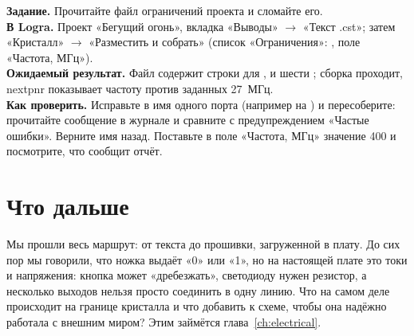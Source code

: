 \begin{diybox}
\textbf{Задание.} Прочитайте файл ограничений проекта и сломайте его.\\
\textbf{В Logra.} Проект «Бегущий огонь», вкладка «Выводы» $\to$ «Текст .cst»; затем «Кристалл» $\to$ «Разместить и собрать» (список «Ограничения»: , поле «Частота, МГц»).\\
\textbf{Ожидаемый результат.} Файл содержит строки  для ,  и шести ; сборка проходит, nextpnr показывает частоту против заданных 27~МГц.\\
\textbf{Как проверить.}  Исправьте в  имя одного порта (например  на ) и пересоберите: прочитайте сообщение в журнале и сравните с предупреждением «Частые ошибки». Верните имя назад.  Поставьте в поле «Частота, МГц» значение 400 и посмотрите, что сообщит отчёт.
\end{diybox}

\section{Что дальше}

Мы прошли весь маршрут: от текста до прошивки, загруженной в плату. До сих пор
мы говорили, что ножка выдаёт «0» или «1», но на настоящей плате это токи и
напряжения: кнопка может «дребезжать», светодиоду нужен резистор, а несколько
выходов нельзя просто соединить в одну линию. Что на самом деле происходит на
границе кристалла и что добавить к схеме, чтобы она надёжно работала с внешним
миром? Этим займётся глава~\ref{ch:electrical}.
